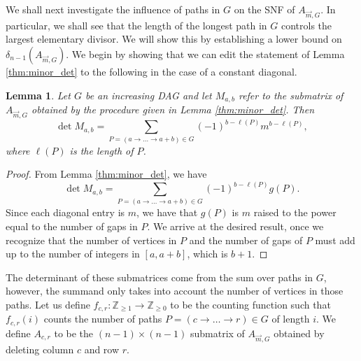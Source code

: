 \documentclass[12pt]{amsart}
\newtheorem{lemma}[thm]{Lemma}
\theoremstyle{definition}
\numberwithin{equation}{section}
\newcommand{\ring}[1]{\ensuremath{\mathbb{#1}}}
\renewcommand\>{\rangle}
\newcommand\<{\langle}
\newcommand\0{\mathbf{0}}
\newcommand\ZZ{\ring{Z}}
\begin{document}
We shall next investigate the influence of paths in $G$ on the SNF of $A_{\vec{m} , G}$. 
In particular, we shall see that the length of the longest path in $G$ controls the largest elementary divisor. 
We will show this by establishing a lower bound on $\delta_{n-1}(A_{\vec{m} , G})$. 
We begin by showing that we can edit the statement of Lemma \ref{thm:minor_det} to the following in the case of a constant diagonal.

\begin{lemma}\label{thm:constant_diag_minors}
	Let $G$ be an increasing DAG and let $M_{a,b}$ refer to the submatrix of $A_{\vec{m}, G}$ obtained by the procedure given in Lemma \ref{thm:minor_det}. Then
	\[\det M_{a,b} = \sum_{P = (a \to \dots \to a+b) \in G} (-1)^{b-\ell(P) } m^{b - \ell(P)},\]
	where $\ell(P)$ is the length of $P$.
\end{lemma}
\begin{proof}
	From Lemma \ref{thm:minor_det}, we have 
	\[\det M_{a, b} = \sum_{P = (a \to \dots \to a+b) \in G}   (-1)^{b-\ell(P)} g(P).\]
	Since each diagonal entry is $m$, we have that $g(P)$ is $m$ raised to the power equal to the number of gaps in $P$. 
	We arrive at the desired result, once we recognize that the number of vertices in $P$ and the number of gaps of $P$ must add up to the number of integers in $[a, a+b]$, which is $b+1$.
\end{proof}

The determinant of these submatrices come from the sum over paths in $G$, however, the summand only takes into account the number of vertices in those paths. 
Let us define $f_{c,r}: \ZZ_{\geq 1} \to \ZZ_{\geq 0}$
to be the counting function such that $f_{c,r}(i)$ counts the number of paths $P = (c \to \dots \to r) \in G$ of length $i$.
We define $A_{c,r}$ to be the $(n-1) \times (n-1)$ submatrix of $A_{\vec{m} ,G}$ obtained by deleting column $c$ and row $r$.
\end{document}
